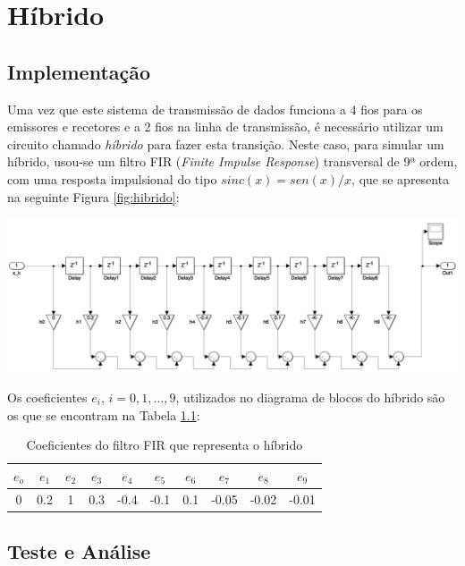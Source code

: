 \documentclass[a4paper,11pt]{report}
\begin{document}
\chapter{Híbrido}
\section{Implementação}
Uma vez que este sistema de transmissão de dados funciona a 4 fios para os emissores e recetores e a 2 fios na linha de transmissão, é necessário utilizar um circuito chamado \textit{híbrido} para fazer esta transição. Neste caso, para simular um híbrido, usou-se um filtro FIR (\textit{Finite Impulse Response}) transversal de 9ª ordem, com uma resposta impulsional do tipo $sinc(x)=sen(x)/x$, que se apresenta na seguinte Figura \ref{fig:hibrido}:

\begin{center}
     \includegraphics[angle=0,width=1\textwidth]{hibrido.png}
     \label{fig:hibrido}
\end{center}

Os coeficientes $e_i$, $i=0,1,...,9$, utilizados no diagrama de blocos do híbrido são os que se encontram na Tabela \ref{tab:coeficientes_hibrido}:

\begin{table}[h]
\centering
\begin{tabular}{ || c | c | c | c | c | c | c | c | c | c || }
\hline
	$e_o$ & $e_1$ & $e_2$ & $e_3$ & $e_4$ & $e_5$ & $e_6$ & $e_7$ & $e_8$ & $e_9$ \\ \hline  \hline
	0 & 0.2 & 1 & 0.3 & -0.4 & -0.1 & 0.1 & -0.05 & -0.02 & -0.01 \\ \hline
\end{tabular}

\caption{Coeficientes do filtro FIR que representa o híbrido \label{tab:coeficientes_hibrido}}

\end{table}

\section{Teste e Análise}
\end{document}
